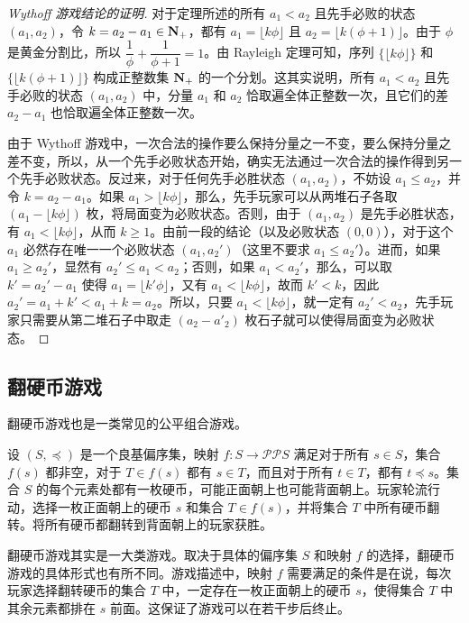 \begin{proof}[Wythoff 游戏结论的证明]
	对于定理所述的所有 $a_1 < a_2$ 且先手必败的状态 $(a_1,a_2)$，令 $k = a_2 - a_1 \in\mathbf{N}_+$，都有 $a_1=\lfloor k\phi\rfloor$ 且 $a_2=\lfloor k(\phi+1)\rfloor$。由于 $\phi$ 是黄金分割比，所以 $\dfrac{1}{\phi}+\dfrac{1}{\phi+1}=1$。由 Rayleigh 定理可知，序列 $\{\lfloor k\phi\rfloor\}$ 和 $\{\lfloor k(\phi+1)\rfloor\}$ 构成正整数集 $\mathbf{N}_+$ 的一个分划。这其实说明，所有 $a_1 < a_2$ 且先手必败的状态 $(a_1,a_2)$ 中，分量 $a_1$ 和 $a_2$ 恰取遍全体正整数一次，且它们的差 $a_2-a_1$ 也恰取遍全体正整数一次。
	
	由于 Wythoff 游戏中，一次合法的操作要么保持分量之一不变，要么保持分量之差不变，所以，从一个先手必败状态开始，确实无法通过一次合法的操作得到另一个先手必败状态。反过来，对于任何先手必胜状态 $(a_1,a_2)$，不妨设 $a_1\le a_2$，并令 $k=a_2-a_1$。如果 $a_1>\lfloor k\phi\rfloor$，那么，先手玩家可以从两堆石子各取 $(a_1 - \lfloor k\phi\rfloor)$ 枚，将局面变为必败状态。否则，由于 $(a_1,a_2)$ 是先手必胜状态，有 $a_1 < \lfloor k\phi\rfloor$，从而 $k\ge 1$。由前一段的结论（以及必败状态 $(0,0)$），对于这个 $a_1$ 必然存在唯一一个必败状态 $(a_1,a_2')$（这里不要求 $a_1\le a_2'$）。进而，如果 $a_1 \ge a_2'$，显然有 $a_2' \le a_1 < a_2$；否则，如果 $a_1 < a_2'$，那么，可以取 $k'=a_2'-a_1$ 使得 $a_1=\lfloor k'\phi\rfloor$，又有 $a_1 < \lfloor k\phi\rfloor$，故而 $k' < k$，因此 $a_2'=a_1 + k' < a_1+k = a_2$。所以，只要 $a_1 < \lfloor k\phi\rfloor$，就一定有 $a_2' < a_2$，先手玩家只需要从第二堆石子中取走 $(a_2-a'_2)$ 枚石子就可以使得局面变为必败状态。
\end{proof}

\subsection{翻硬币游戏}

翻硬币游戏也是一类常见的公平组合游戏。

\begin{game}[翻硬币]
	设 $(S,\preceq)$ 是一个良基偏序集，映射 $f:S\rightarrow\mathcal{P}\mathcal{P}S$ 满足对于所有 $s\in S$，集合 $f(s)$ 都非空，对于 $T\in f(s)$ 都有 $s\in T$，而且对于所有 $t\in T$，都有 $t\preceq s$。集合 $S$ 的每个元素处都有一枚硬币，可能正面朝上也可能背面朝上。玩家轮流行动，选择一枚正面朝上的硬币 $s$ 和集合 $T\in f(s)$，并将集合 $T$ 中所有硬币翻转。将所有硬币都翻转到背面朝上的玩家获胜。
\end{game}

翻硬币游戏其实是一大类游戏。取决于具体的偏序集 $S$ 和映射 $f$ 的选择，翻硬币游戏的具体形式也有所不同。游戏描述中，映射 $f$ 需要满足的条件是在说，每次玩家选择翻转硬币的集合 $T$ 中，一定存在一枚正面朝上的硬币 $s$，使得集合 $T$ 中其余元素都排在 $s$ 前面。这保证了游戏可以在若干步后终止。

